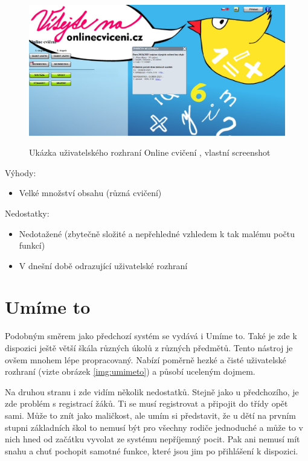 \begin{figure}[H]
    \caption{Ukázka uživatelského rozhraní Online cvičení \cite{onlinecviceni}, vlastní screenshot}
    \centering
    \includegraphics[width=\textwidth]{images/onlinecviceni}
    \label{img:onlinecviceni}
\end{figure}

Výhody:
\begin{itemize}
    \item Velké množství obsahu (různá cvičení)
\end{itemize}

Nedostatky:
\begin{itemize}
    \item Nedotažené (zbytečně složité a nepřehledné vzhledem k tak malému počtu funkcí)
    \item V dnešní době odrazující uživatelské rozhraní
\end{itemize}

\section{Umíme to}

Podobným směrem jako předchozí systém se vydává i Umíme to. Také je zde k dispozici ještě větší škála různých úkolů z různých předmětů. Tento nástroj je ovšem mnohem lépe propracovaný. Nabízí poměrně hezké a čisté uživatelské rozhraní (vizte obrázek \ref{img:umimeto}) a působí uceleným dojmem.

Na druhou stranu i zde vidím několik nedostatků. Stejně jako u předchozího, je zde problém s registrací žáků. Ti se musí registrovat a připojit do třídy opět sami. Může to znít jako maličkost, ale umím si představit, že u dětí na prvním stupni základních škol to nemusí být pro všechny rodiče jednoduché a může to v nich hned od začátku vyvolat ze systému nepříjemný pocit. Pak ani nemusí mít snahu a chuť pochopit samotné funkce, které jsou jim po přihlášení k dispozici.


